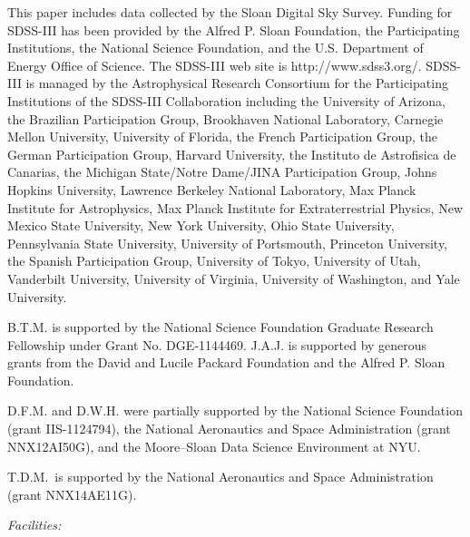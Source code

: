 \documentclass{emulateapj}
\newcommand{\todo}[3]{{\color{#2} \emph{#1} TO DO: #3}}
\newcommand{\btmtodo}[1]{\todo{BEN}{red}{#1}}
\begin{document}
This paper includes data collected by the Sloan Digital Sky Survey.
Funding for SDSS-III has been provided by the Alfred P. Sloan Foundation,
the Participating Institutions, the National Science Foundation, and the
U.S. Department of Energy Office of Science. The SDSS-III web site is
http://www.sdss3.org/.
SDSS-III is managed by the Astrophysical Research Consortium for the
Participating Institutions of the SDSS-III Collaboration including the
University of Arizona, the Brazilian Participation Group, Brookhaven
National Laboratory, Carnegie Mellon University, University of Florida,
the French Participation Group, the German Participation Group, Harvard
University, the Instituto de Astrofisica de Canarias, the Michigan
State/Notre Dame/JINA Participation Group, Johns Hopkins University,
Lawrence Berkeley National Laboratory, Max Planck Institute for
Astrophysics, Max Planck Institute for Extraterrestrial Physics, New
Mexico State University, New York University, Ohio State University,
Pennsylvania State University, University of Portsmouth, Princeton
University, the Spanish Participation Group, University of Tokyo,
University of Utah, Vanderbilt University, University of Virginia,
University of Washington, and Yale University.

B.T.M. is supported by the National Science Foundation Graduate Research
Fellowship under Grant No. DGE‐1144469.
J.A.J. is supported by generous grants from the David and Lucile Packard
Foundation and the Alfred P. Sloan Foundation.


D.F.M. and D.W.H. were partially supported by the National Science Foundation
(grant IIS-1124794), the National Aeronautics and Space Administration (grant
NNX12AI50G), and the Moore–Sloan Data Science Environment at NYU.

T.D.M.~is supported by the National Aeronautics and Space Administration (grant
NNX14AE11G).

{\it Facilities:} %









\end{document}
